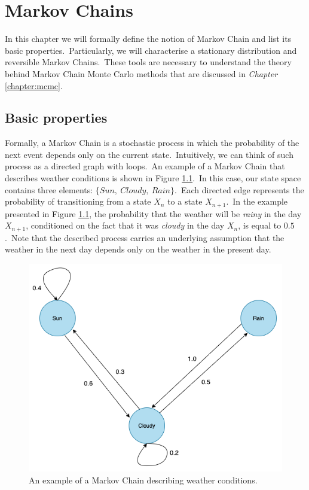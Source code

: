 \documentclass[a4paper, 11pt, onecolumn, openany, titlepage]{report}
\newcommand\numberedchapter[1]{\setlength\topskip{3cm}\chapter{#1}\setlength\topskip{0cm}}
\theoremstyle{default_theorem_style}\newtheorem{theorem}{Theorem}
\theoremstyle{default_theorem_style}\newtheorem{definition}{Definition}
\begin{document}
\numberedchapter{Markov Chains}

In this chapter we will formally define the notion of Markov Chain and list its basic properties.\ Particularly,
we will characterise a stationary distribution and reversible Markov Chains.\ These tools are necessary to understand
the theory behind Markov Chain Monte Carlo methods that are discussed in \textit{Chapter} \ref{chapter:mcmc}.

\section{Basic properties}

Formally, a Markov Chain is a stochastic process in which the probability of the next event depends only on the current
state.\ Intuitively, we can think of such process as a directed graph with loops.\ An example of a Markov Chain that
describes weather conditions is shown in Figure \ref{fig:markov_chain}.\ In this case, our state space contains three
elements: $\{Sun,\ Cloudy,\ Rain\}$.\ Each directed edge represents the probability of transitioning from a state
$X_{n}$ to a state $X_{n + 1}$.\ In the example presented in Figure \ref{fig:markov_chain}, the probability that the
weather will be \textit{rainy} in the day $X_{n + 1}$, conditioned on the fact that it was \textit{cloudy} in the
day $X_n$, is equal to $0.5$.\ Note that the described process carries an underlying assumption that the weather in
the next day depends only on the weather in the present day.

\begin{figure}[H]
\centering
\includegraphics[scale=0.4]{markov_chain}
\caption{An example of a Markov Chain describing weather conditions.}
\label{fig:markov_chain}
\end{figure}
\end{document}
